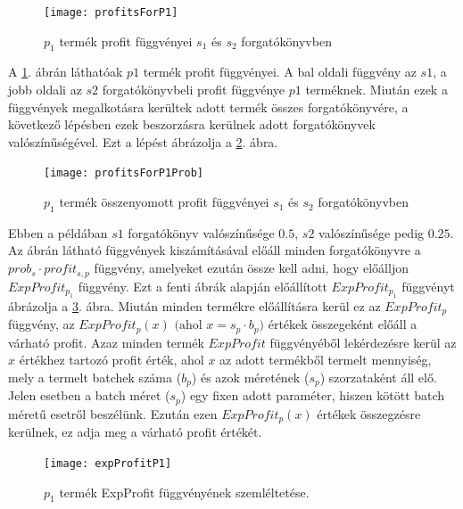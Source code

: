 \begin{figure}[H]
\begin{center}
\texttt{[image: profitsForP1]}
\caption{$p_1$ termék profit függvényei $s_1$ és $s_2$ forgatókönyvben}
\label{profit_for_p1}
\end{center}
\end{figure}
A \ref{profit_for_p1}. ábrán láthatóak $p1$ termék profit függvényei.
A bal oldali függvény az $s1$, a jobb oldali az $s2$ forgatókönyvbeli profit függvénye $p1$ terméknek.
Miután ezek a függvények megalkotásra kerültek adott termék összes forgatókönyvére, a következő lépésben ezek beszorzásra kerülnek adott forgatókönyvek valószínűségével.
Ezt a lépést ábrázolja a \ref{profit_for_p1_prob}. ábra.
\begin{figure}
\begin{center}
\texttt{[image: profitsForP1Prob]}
\caption{$p_1$ termék összenyomott profit függvényei $s_1$ és $s_2$ forgatókönyvben}
\label{profit_for_p1_prob}
\end{center}
\end{figure}
Ebben a példában $s1$ forgatókönyv valószínűsége $0.5$, $s2$ valószínűsége pedig $0.25$.
Az ábrán látható függvények kiszámításával előáll minden forgatókönyvre a $prob_s \cdot profit_{s,p}$ függvény, amelyeket ezután össze kell adni, hogy előálljon $ExpProfit_{p_1}$ függvény.
Ezt a fenti ábrák alapján előállított $ExpProfit_{p_1}$ függvényt ábrázolja a \ref{expProfit_p1}. ábra.
Miután minden termékre előállításra kerül ez az $ExpProfit_p$ függvény, az $ExpProfit_p(x) \text{ (ahol }x=s_p \cdot b_p)$ értékek összegeként előáll a várható profit.
Azaz minden termék $ExpProfit$ függvényéből lekérdezésre kerül az $x$ értékhez tartozó profit érték, ahol $x$ az adott termékből termelt mennyiség, mely a termelt batchek száma ($b_p$) és azok méretének ($s_p$) szorzataként áll elő.
Jelen esetben a batch méret ($s_p$) egy fixen adott paraméter, hiszen kötött batch méretű esetről beszélünk.
Ezután ezen $ExpProfit_p(x)$ értékek összegzésre kerülnek, ez adja meg a várható profit értékét.
\begin{figure}[H]
\begin{center}
\texttt{[image: expProfitP1]}
\caption{$p_1$ termék ExpProfit függvényének szemléltetése.}
\label{expProfit_p1}
\end{center}
\end{figure}
